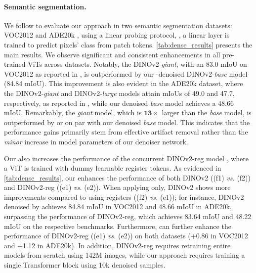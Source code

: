 \paragraph{Semantic segmentation.} We follow \cite{oquab2023dinov2,darcet2023vision} to evaluate our approach in two semantic segmentation datasets: VOC2012 \cite{pascal-voc-2012}
and ADE20k \cite{zhou2018semantic}, using a linear probing protocol, \ie, a linear layer is trained to predict pixels' class from patch tokens.
\cref{tab:dense_results}
presents the main results. We observe significant and consistent enhancements in all pre-trained ViTs across datasets. Notably, the DINOv2-\textit{giant}, with an 83.0 mIoU on VOC2012 as reported in \cite{oquab2023dinov2}, is outperformed by our \ours-denoised DINOv2-\textit{base} model (84.84 mIoU). This improvement is also evident in the ADE20k dataset, where the DINOv2-\textit{giant} and DINOv2-\textit{large} models attain mIoUs of 49.0 and 47.7, respectively, as reported in \cite{oquab2023dinov2}, while our denoised \textit{base} model achieves a 48.66 mIoU. Remarkably, the \textit{giant} model, which is $\mathbf{13\times}$ larger than the \textit{base} model, is outperformed by or on par with our denoised \textit{base} model. This indicates that the performance gains primarily stem from effective artifact removal rather than the \textit{minor} increase in model parameters of our denoiser network.

Our \ours also increases the performance of the concurrent DINOv2-reg model \cite{darcet2023vision}, where a ViT is trained with dummy learnable register tokens. As evidenced in \cref{tab:dense_results}, our \ours enhances the performance of both DINOv2 ((f1) \textit{vs.} (f2)) and DINOv2-reg ((e1) \textit{vs.} (e2)). When applying \ours only, DINOv2 shows more improvements compared to using registers ((f2) \textit{vs.} (e1)); for instance, DINOv2 denoised by \ours achieves 84.84 mIoU in VOC2012 and 48.66 mIoU in ADE20k, surpassing the performance of DINOv2-reg, which achieves 83.64 mIoU and 48.22 mIoU on the respective benchmarks. Furthermore, \ours can further enhance the performance of DINOv2-reg ((e1) \textit{vs.} (e2)) on both datasets (+0.86 in VOC2012 and +1.12 in ADE20k).
In addition, DINOv2-reg \cite{darcet2023vision} requires retraining entire models from scratch using 142M images, while our approach requires training a single Transformer block using 10k denoised samples.

